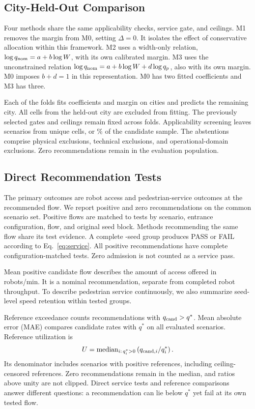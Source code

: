 \documentclass[NewProceedings,letterpaper]{ascelike-new}
\begin{document}
\subsection{City-Held-Out Comparison}
Four methods share the same applicability checks, service gate, and ceilings. M1 removes the margin from M0, setting $\Delta=0$. It isolates the effect of conservative allocation within this framework. M2 uses a width-only relation, $\log q_{\rm nom}=a+b\log W$, with its own calibrated margin. M3 uses the unconstrained relation $\log q_{\rm nom}=a+b\log W+d\log q_p$, also with its own margin. M0 imposes $b+d=1$ in this representation. M0 has two fitted coefficients and M3 has three.

Each of the \Cities{} folds fits coefficients and margin on \TrainCities{} cities and predicts the remaining city. All cells from the held-out city are excluded from fitting. The previously selected gates and ceilings remain fixed across folds. Applicability screening leaves \EvalN{} scenarios from \EvalCells{} unique cells, or \Coverage{}\% of the candidate sample. The \AbstainN{} abstentions comprise \GeometryExcluded{} physical exclusions, \TechnicalExcluded{} technical exclusions, and \DomainExcluded{} operational-domain exclusions. Zero recommendations remain in the evaluation population.

\subsection{Direct Recommendation Tests}
The primary outcomes are robot access and pedestrian-service outcomes at the recommended flow. We report positive and zero recommendations on the common scenario set. Positive flows are matched to tests by scenario, entrance configuration, flow, and original seed block. Methods recommending the same flow share its test evidence. A complete \SeedN{}-seed group produces PASS or FAIL according to Eq.~\ref{eq:service}. All positive recommendations have complete configuration-matched tests. Zero admission is not counted as a service pass.

Mean positive candidate flow describes the amount of access offered in robots/min. It is a nominal recommendation, separate from completed robot throughput. To describe pedestrian service continuously, we also summarize seed-level speed retention within tested groups.

Reference exceedance counts recommendations with $q_{\rm cand}>q^*$. Mean absolute error (MAE) compares candidate rates with $q^*$ on all \EvalN{} evaluated scenarios. Reference utilization is
\begin{equation}
 U=\operatorname{median}_{i:\,q_i^*>0}
       \left(q_{{\rm cand},i}/q_i^*\right).
 \label{eq:utilization}
\end{equation}
Its denominator includes \UtilN{} scenarios with positive references, including \EvalCensored{} ceiling-censored references. Zero recommendations remain in the median, and ratios above unity are not clipped. Direct service tests and reference comparisons answer different questions: a recommendation can lie below $q^*$ yet fail at its own tested flow.
\end{document}
